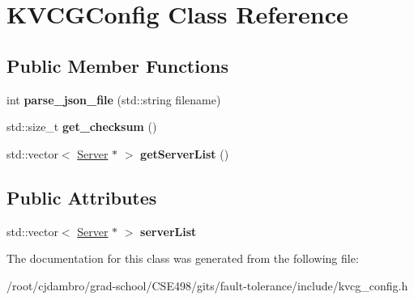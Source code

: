 \hypertarget{classKVCGConfig}{\section{K\-V\-C\-G\-Config Class Reference}
\label{classKVCGConfig}
}
\subsection*{Public Member Functions}
\begin{DoxyCompactItemize}
\item 
\hypertarget{classKVCGConfig_a47206f279489aacccb9200f0bf9b36cf}{int {\bfseries parse\-\_\-json\-\_\-file} (std\-::string filename)}\label{classKVCGConfig_a47206f279489aacccb9200f0bf9b36cf}

\item 
\hypertarget{classKVCGConfig_a873ecf819a05b79ccced5e5dada7843f}{std\-::size\-\_\-t {\bfseries get\-\_\-checksum} ()}\label{classKVCGConfig_a873ecf819a05b79ccced5e5dada7843f}

\item 
\hypertarget{classKVCGConfig_a61fb9cd072f12acd361c7bed3936bd4b}{std\-::vector$<$ \hyperlink{classServer}{Server} $\ast$ $>$ {\bfseries get\-Server\-List} ()}\label{classKVCGConfig_a61fb9cd072f12acd361c7bed3936bd4b}

\end{DoxyCompactItemize}
\subsection*{Public Attributes}
\begin{DoxyCompactItemize}
\item 
\hypertarget{classKVCGConfig_ac399247c83fe9753fd6708330066cc4d}{std\-::vector$<$ \hyperlink{classServer}{Server} $\ast$ $>$ {\bfseries server\-List}}\label{classKVCGConfig_ac399247c83fe9753fd6708330066cc4d}

\end{DoxyCompactItemize}


The documentation for this class was generated from the following file\-:\begin{DoxyCompactItemize}
\item 
/root/cjdambro/grad-\/school/\-C\-S\-E498/gits/fault-\/tolerance/include/kvcg\-\_\-config.\-h\end{DoxyCompactItemize}
